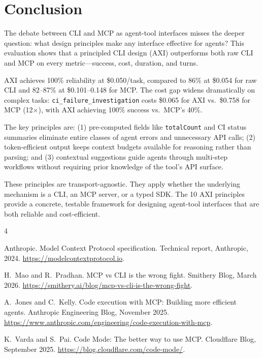 \documentclass{article}
\begin{document}
\section{Conclusion}
\label{sec:conclusion}

The debate between CLI and MCP as agent-tool interfaces misses the deeper
question: what design principles make any interface effective for agents?
This evaluation shows that a principled CLI design (AXI) outperforms both
raw CLI and MCP on every metric---success, cost, duration, and turns.

AXI achieves 100\% reliability at \$0.050/task, compared to 86\% at
\$0.054 for raw CLI and 82--87\% at \$0.101--0.148 for MCP. The cost gap
widens dramatically on complex tasks: \texttt{ci\_failure\_investigation}
costs \$0.065 for AXI vs.\ \$0.758 for MCP (12$\times$), with AXI achieving
100\% success vs.\ MCP's 40\%.

The key principles are: (1) pre-computed fields like \texttt{totalCount} and
CI status summaries eliminate entire classes of agent errors and unnecessary
API calls; (2) token-efficient output keeps context budgets available for
reasoning rather than parsing; and (3) contextual suggestions guide agents
through multi-step workflows without requiring prior knowledge of the tool's
API surface.

These principles are transport-agnostic. They apply whether the underlying
mechanism is a CLI, an MCP server, or a typed SDK. The 10 AXI principles
provide a concrete, testable framework for designing agent-tool interfaces
that are both reliable and cost-efficient.


\begin{thebibliography}{4}

Anthropic.
\newblock Model Context Protocol specification.
\newblock Technical report, Anthropic, 2024.
\newblock \url{https://modelcontextprotocol.io}.

H.~Mao and R.~Pradhan.
\newblock MCP vs CLI is the wrong fight.
\newblock Smithery Blog, March 2026.
\newblock \url{https://smithery.ai/blog/mcp-vs-cli-is-the-wrong-fight}.

A.~Jones and C.~Kelly.
\newblock Code execution with MCP: Building more efficient agents.
\newblock Anthropic Engineering Blog, November 2025.
\newblock \url{https://www.anthropic.com/engineering/code-execution-with-mcp}.

K.~Varda and S.~Pai.
\newblock Code Mode: The better way to use MCP.
\newblock Cloudflare Blog, September 2025.
\newblock \url{https://blog.cloudflare.com/code-mode/}.

\end{thebibliography}
\end{document}
